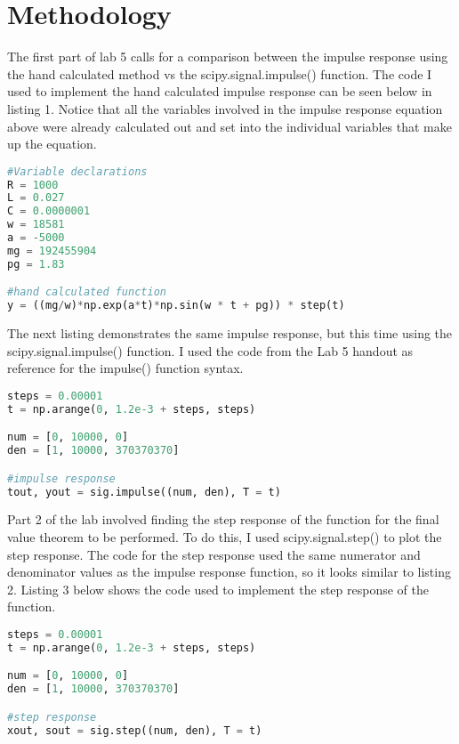 \documentclass[12pt]{report}
\begin{document}
\section{Methodology}
\hspace{\parindent}The first part of lab 5 calls for a comparison between the impulse response using the hand calculated method vs the scipy.signal.impulse() function. The code I used to implement the hand calculated impulse response can be seen below in listing 1. Notice that all the variables involved in the impulse response equation above were already calculated out and set into the individual variables that make up the equation. \par
\begin{lstlisting}[language=Python, caption=Hand Calculated Function Code]
#Variable declarations
R = 1000
L = 0.027
C = 0.0000001
w = 18581
a = -5000
mg = 192455904
pg = 1.83

#hand calculated function
y = ((mg/w)*np.exp(a*t)*np.sin(w * t + pg)) * step(t)
\end{lstlisting}
\hspace{\parindent}The next listing demonstrates the same impulse response, but this time using the scipy.signal.impulse() function. I used the code from the Lab 5 handout as reference for the impulse() function syntax. \par
\begin{lstlisting}[language=Python, caption=Impulse() Function Code]
steps = 0.00001
t = np.arange(0, 1.2e-3 + steps, steps)

num = [0, 10000, 0]
den = [1, 10000, 370370370]

#impulse response
tout, yout = sig.impulse((num, den), T = t)
\end{lstlisting}
\hspace{\parindent}Part 2 of the lab involved finding the step response of the function for the final value theorem to be performed. To do this, I used scipy.signal.step() to plot the step response. The code for the step response used the same numerator and denominator values as the impulse response function, so it looks similar to listing 2. Listing 3 below shows the code used to implement the step response of the function. \par
\begin{lstlisting}[language=Python, caption=Step() Response Code]
steps = 0.00001
t = np.arange(0, 1.2e-3 + steps, steps)

num = [0, 10000, 0]
den = [1, 10000, 370370370]

#step response
xout, sout = sig.step((num, den), T = t)
\end{lstlisting}
\end{document}
